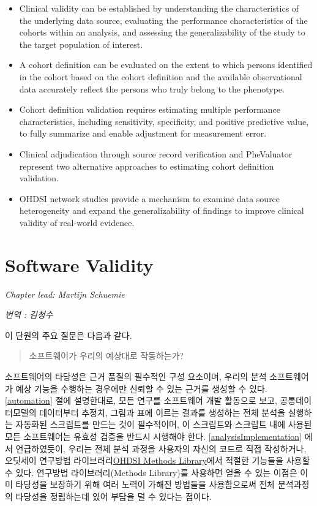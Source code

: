 \documentclass[11pt]{book}
\providecommand{\tightlist}{%
  \setlength{\itemsep}{0pt}\setlength{\parskip}{0pt}}
\theoremstyle{definition}
\theoremstyle{definition}
\theoremstyle{definition}
\theoremstyle{remark}
\let\BeginKnitrBlock\begin \let\EndKnitrBlock\end
\begin{document}
\BeginKnitrBlock{rmdsummary}
\begin{itemize}
\tightlist
\item
  Clinical validity can be established by understanding the
  characteristics of the underlying data source, evaluating the
  performance characteristics of the cohorts within an analysis, and
  assessing the generalizability of the study to the target population
  of interest.
\item
  A cohort definition can be evaluated on the extent to which persons
  identified in the cohort based on the cohort definition and the
  available observational data accurately reflect the persons who truly
  belong to the phenotype.
\item
  Cohort definition validation requires estimating multiple performance
  characteristics, including sensitivity, specificity, and positive
  predictive value, to fully summarize and enable adjustment for
  measurement error.
\item
  Clinical adjudication through source record verification and
  PheValuator represent two alternative approaches to estimating cohort
  definition validation.
\item
  OHDSI network studies provide a mechanism to examine data source
  heterogeneity and expand the generalizability of findings to improve
  clinical validity of real-world evidence.
\end{itemize}
\EndKnitrBlock{rmdsummary}

\chapter{Software Validity}\label{SoftwareValidity}

\emph{Chapter lead: Martijn Schuemie}

\emph{번역 : 김청수}

이 단원의 주요 질문은 다음과 같다.

\begin{quote}
소프트웨어가 우리의 예상대로 작동하는가?
\end{quote}

소프트웨어의 타당성은 근거 품질의 필수적인 구성 요소이며, 우리의 분석
소프트웨어가 예상 기능을 수행하는 경우에만 신뢰할 수 있는 근거를 생성할
수 있다. \ref{automation} 절에 설명한대로, 모든 연구를 소프트웨어 개발
활동으로 보고, 공통데이터모델의 데이터부터 추정치, 그림과 표에 이르는
결과를 생성하는 전체 분석을 실행하는 자동화된 스크립트를 만드는 것이
필수적이며, 이 스크립트와 스크립트 내에 사용된 모든 소프트웨어는 유효성
검증을 반드시 시행해야 한다. \ref{analysisImplementation} 에서
언급하였듯이, 우리는 전체 분석 과정을 사용자의 자신의 코드로 직접
작성하거나, 오딧세이 연구방법
라이브러리\href{https://ohdsi.github.io/MethodsLibrary/}{OHDSI Methods
Library}에서 적절한 기능들을 사용할 수 있다. 연구방법 라이브러리(Methods
Library)를 사용하면 얻을 수 있는 이점은 이미 타당성을 보장하기 위해 여러
노력이 가해진 방법들을 사용함으로써 전체 분석과정의 타당성을 정립하는데
있어 부담을 덜 수 있다는 점이다. 
\end{document}

